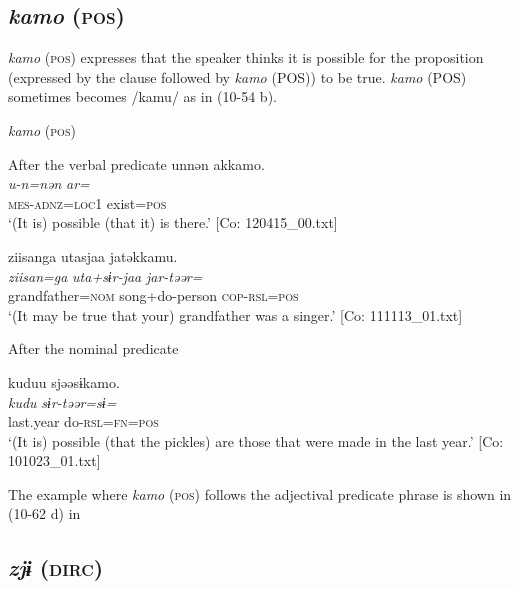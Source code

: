 \subsection{\textit{kamo} (\textsc{pos})}\label{sec:10.3.8}

\textit{kamo} (\textsc{pos}) expresses that the speaker thinks it is possible for the proposition (expressed by the clause followed by \textit{kamo} (POS)) to be true. \textit{kamo} (POS) sometimes becomes /kamu/ as in (10-54 b).

\ea\label{ex:10.54}   \textit{kamo} (\textsc{pos})\\
  \begin{xlist}
  \exi{} After the verbal predicate
  \ex  %
      \glll    unnən  akkamo.\\
      \textit{u-n=nən}  \textit{ar=}\\
      \textsc{mes}-\textsc{adnz}=\textsc{loc}1  exist=\textsc{pos}\\
      \glt       ‘(It is) possible (that it) is there.’ [Co: 120415\_00.txt]

  \ex  %
      \glll    ziisanga  utasjaa  jatəkkamu.\\
      \textit{ziisan=ga}  \textit{uta+sɨr-jaa}  \textit{jar-təər=}\\
      grandfather=\textsc{nom}  song+do-person  \textsc{cop}-\textsc{rsl}=\textsc{pos}\\
      \glt       ‘(It may be true that your) grandfather was a singer.’ [Co: 111113\_01.txt]

  \exi{} After the nominal predicate

  \ex  %
      \glll    kuduu  sjəəsɨkamo.\\
      \textit{kudu}  \textit{sɨr-təər=sɨ=}\\
      last.year  do-\textsc{rsl}=\textsc{fn}=\textsc{pos}\\
      \glt       ‘(It is) possible (that the pickles) are those that were made in the last year.’ [Co: 101023\_01.txt]
    \end{xlist}
\z

The example where \textit{kamo} (\textsc{pos}) follows the adjectival predicate phrase is shown in (10-62 d) in 

\subsection{\textit{zjɨ} (\textsc{dirc})}\label{sec:10.3.9}

